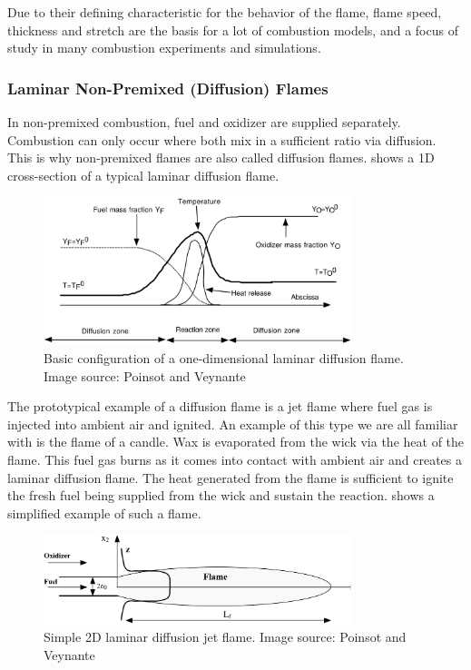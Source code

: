 %
Due to their defining characteristic for the behavior of the flame, flame speed,
thickness and stretch are the basis for a lot of combustion models, and a focus
of study in many combustion experiments and simulations.
%
%
\subsubsection{Laminar Non-Premixed (Diffusion) Flames} %
\label{ssub:laminar_diffusion_flames}
%
In non-premixed combustion, fuel and oxidizer are supplied separately.
%
Combustion can only occur where both mix in a sufficient ratio via diffusion.
%
This is why non-premixed flames are also called diffusion flames.
%
 shows a \ac{1D} cross-section of a
typical laminar diffusion flame.
%
\begin{figure}[t]
    \centering
    \includegraphics[width=0.8\textwidth]{figures/laminar_diffusion_flame.png}
    \caption{Basic configuration of a one-dimensional laminar diffusion flame.
    Image source: Poinsot and Veynante~\cite{Poinsot2012}}
    \label{fig:laminar_diffusion_profiles}
\end{figure}
%

%
The prototypical example of a diffusion flame is a jet flame where fuel gas is
injected into ambient air and ignited.
%
An example of this type we are all familiar with is the flame of a candle.
%
Wax is evaporated from the wick via the heat of the flame.
%
This fuel gas burns as it comes into contact with ambient air and creates a
laminar diffusion flame.
%
The heat generated from the flame is sufficient to ignite the fresh fuel being
supplied from the wick and sustain the reaction.
%
 shows a simplified example of such a flame.
%
\begin{figure}[t]
    \centering
    \includegraphics[width=0.8\textwidth]{figures/laminar_diffusion_jet.png}
    \caption{Simple \ac{2D} laminar diffusion jet flame. Image source: Poinsot
    and Veynante~\cite{Poinsot2012}}
    \label{fig:laminar_diffusion_jet}
\end{figure}
%

